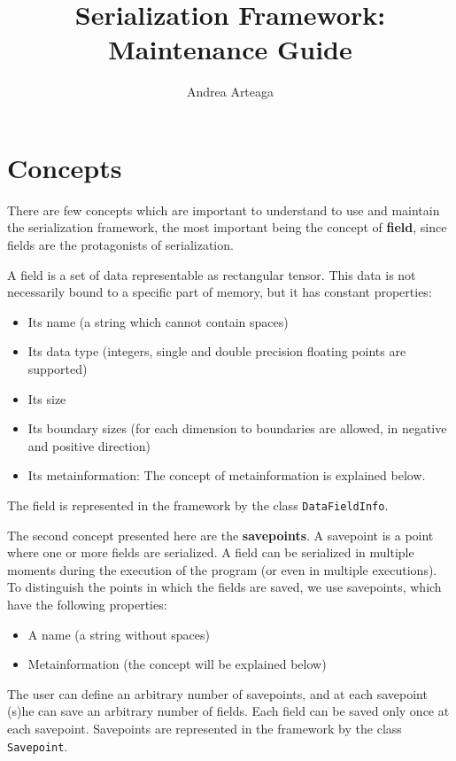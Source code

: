 \documentclass[a4paper,10pt]{article}
\title{Serialization Framework: Maintenance Guide}
\author{Andrea Arteaga}
\begin{document}
\maketitle

\section{Concepts}

There are few concepts which are important to understand to use and maintain 
the serialization framework, the most important being the concept of 
\textbf{field}, since fields are the protagonists of serialization.

A field is a set of data representable as rectangular tensor. This data is not 
necessarily bound to a specific part of memory, but it has constant properties:

\begin{itemize}
 \item Its name (a string which cannot contain spaces)
 \item Its data type (integers, single and double precision floating points are 
supported)
 \item Its size
 \item Its boundary sizes (for each dimension to boundaries are allowed, in 
negative and positive direction)
 \item Its metainformation: The concept of metainformation is explained below.
\end{itemize}

The field is represented in the framework by the class \texttt{DataFieldInfo}.

The second concept presented here are the \textbf{savepoints}. A savepoint is a 
point where one or more fields are serialized. A field can be serialized in 
multiple moments during the execution of the program (or even in multiple 
executions). To distinguish the points in which the fields are saved, we use 
savepoints, which have the following properties:

\begin{itemize}
 \item A name (a string without spaces)
 \item Metainformation (the concept will be explained below)
\end{itemize}

The user can define an arbitrary number of savepoints, and at each savepoint 
(s)he can save an arbitrary number of fields. Each field can be saved only once 
at each savepoint. Savepoints are represented in the framework by the class 
\texttt{Savepoint}.
\end{document}
